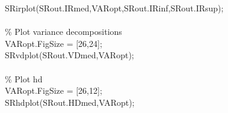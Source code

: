 \hspace{1mm}\hspace{5mm} \hspace{5mm} SRirplot(SRout.IRmed,VARopt,SRout.IRinf,SRout.IRsup); \\ 
\hspace{1mm}\hspace{5mm} \hspace{5mm}  \\ 
\hspace{1mm}\hspace{5mm} \hspace{5mm} \textcolor{matlabgreen}{\% Plot variance decompositions }\\ 
\hspace{1mm}\hspace{5mm} \hspace{5mm} VARopt.FigSize = [26,24]; \\ 
\hspace{1mm}\hspace{5mm} \hspace{5mm} SRvdplot(SRout.VDmed,VARopt); \\ 
\hspace{1mm}\hspace{5mm} \hspace{5mm}  \\ 
\hspace{1mm}\hspace{5mm} \hspace{5mm} \textcolor{matlabgreen}{\% Plot hd }\\ 
\hspace{1mm}\hspace{5mm} \hspace{5mm} VARopt.FigSize = [26,12]; \\ 
\hspace{1mm}\hspace{5mm} \hspace{5mm} SRhdplot(SRout.HDmed,VARopt); \\ 
\hspace{1mm}\hspace{5mm} \hspace{5mm}  \\ 
\hspace{1mm}\hspace{5mm} \hspace{5mm}  \\ 
\hspace{1mm}\hspace{5mm} \hspace{5mm}  \\ 
